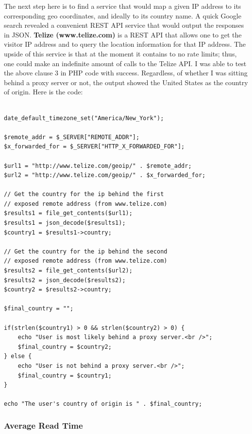 \documentclass[12pt]{article}
\begin{document}
The next step here is to find a service that would map a given IP address to its corresponding geo coordinates, and ideally to its country name. A quick Google search revealed a convenient REST API service that would output the responses in JSON. \textbf{Telize (www.telize.com)} is a REST API that allows one to get the visitor IP address and to query the location information for that IP address. The upside of this service is that at the moment it contains to no rate limits; thus, one could make an indefinite amount of calls to the Telize API. I was able to test the above clause 3 in PHP code with success. Regardless, of whether I was sitting behind a proxy server or not, the output showed the United States as the country of origin. Here is the code:
\begin{lstlisting}[basicstyle=\scriptsize]

date_default_timezone_set("America/New_York");

$remote_addr = $_SERVER["REMOTE_ADDR"];
$x_forwarded_for = $_SERVER["HTTP_X_FORWARDED_FOR"];

$url1 = "http://www.telize.com/geoip/" . $remote_addr; 
$url2 = "http://www.telize.com/geoip/" . $x_forwarded_for; 

// Get the country for the ip behind the first
// exposed remote address (from www.telize.com)
$results1 = file_get_contents($url1);
$results1 = json_decode($results1);
$country1 = $results1->country;

// Get the country for the ip behind the second
// exposed remote address (from www.telize.com)
$results2 = file_get_contents($url2);
$results2 = json_decode($results2);
$country2 = $results2->country;

$final_country = "";

if(strlen($country1) > 0 && strlen($country2) > 0) {
	echo "User is most likely behind a proxy server.<br />"; 
	$final_country = $country2;
} else {
	echo "User is not behind a proxy server.<br />";
	$final_country = $country1;
}

echo "The user's country of origin is " . $final_country;

\end{lstlisting}   

\subsubsection{Average Read Time}
\end{document}
